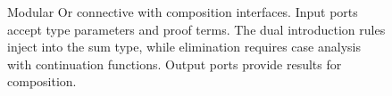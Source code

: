\documentclass[letterpaper]{article}
\begin{document}
\begin{figure}[h!]
\caption{Modular Or connective with composition interfaces. Input ports accept type parameters and proof terms. The dual introduction rules inject into the sum type, while elimination requires case analysis with continuation functions. Output ports provide results for composition.}
\label{fig:or_modular}
\end{figure}
\end{document}
